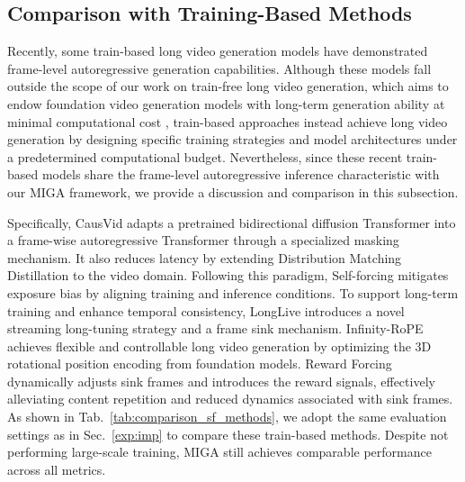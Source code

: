 \documentclass{llmxive}
\begin{document}
\subsection{Comparison with Training-Based Methods}
\label{app:comp_sf}

Recently, some train-based long video generation models have demonstrated frame-level autoregressive generation capabilities. 
Although these models fall outside the scope of our work on train-free long video generation, which aims to endow foundation video generation models with long-term generation ability at minimal computational cost \cite{lu2024freelong}, train-based approaches instead achieve long video generation by designing specific training strategies and model architectures under a predetermined computational budget. 
Nevertheless, since these recent train-based models share the frame-level autoregressive inference characteristic with our MIGA framework, we provide a discussion and comparison in this subsection.


Specifically, CausVid \cite{yin2025slow} adapts a pretrained bidirectional diffusion Transformer into a frame-wise autoregressive Transformer through a specialized masking mechanism. It also reduces latency by extending Distribution Matching Distillation \cite{yin2024improved,yin2024one} to the video domain.  
Following this paradigm, Self-forcing \cite{huang2025self} mitigates exposure bias by aligning training and inference conditions. To support long-term training and enhance temporal consistency, LongLive \cite{yang2025longlive} introduces a novel streaming long-tuning strategy and a frame sink mechanism.  
Infinity-RoPE \cite{yesiltepe2025infinity} achieves flexible and controllable long video generation by optimizing the 3D rotational position encoding  from foundation models.
Reward Forcing \cite{lu2025reward} dynamically adjusts sink frames and introduces the reward signals, effectively alleviating content repetition and reduced dynamics associated with sink frames.
As shown in Tab.~\ref{tab:comparison_sf_methods}, we adopt the same evaluation settings as in Sec.~\ref{exp:imp} to compare these train-based methods. Despite not performing large-scale training, MIGA still achieves comparable performance across all metrics.
\end{document}
